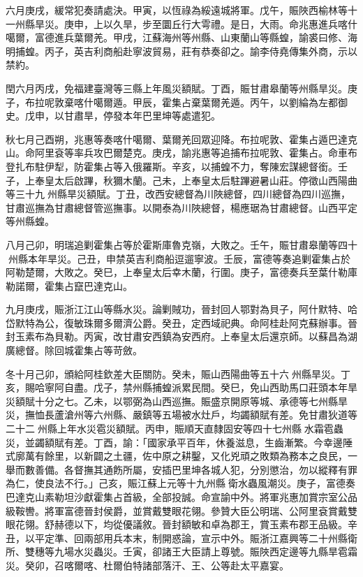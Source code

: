 \begin{pinyinscope}
六月庚戌，緩常犯奏請處決。甲寅，以恆祿為綏遠城將軍。戊午，賑陜西榆林等十一州縣旱災。庚申，上以久旱，步至圜丘行大雩禮。是日，大雨。命兆惠進兵喀什噶爾，富德進兵葉爾羌。甲戌，江蘇海州等州縣、山東蘭山等縣蝗，諭裘曰修、海明捕蝗。丙子，英吉利商船赴寧波貿易，莊有恭奏卻之。諭李侍堯傳集外商，示以禁約。

閏六月丙戌，免福建臺灣等三縣上年風災額賦。丁酉，賑甘肅皋蘭等州縣旱災。庚子，布拉呢敦棄喀什噶爾遁。甲辰，霍集占棄葉爾羌遁。丙午，以劉綸為左都御史。戊申，以甘肅旱，停發本年巴里坤等處遣犯。

秋七月己酉朔，兆惠等奏喀什噶爾、葉爾羌回眾迎降。布拉呢敦、霍集占遁巴達克山。命阿里袞等率兵攻巴爾楚克。庚戌，諭兆惠等追捕布拉呢敦、霍集占。命車布登扎布駐伊犁，防霍集占等入俄羅斯。辛亥，以捕蝗不力，奪陳宏謀總督銜。壬子，上奉皇太后啟蹕，秋獮木蘭。己未，上奉皇太后駐蹕避暑山莊。停徵山西陽曲等三十九州縣旱災額賦。丁丑，改西安總督為川陜總督，四川總督為四川巡撫，甘肅巡撫為甘肅總督管巡撫事。以開泰為川陜總督，楊應琚為甘肅總督。山西平定等州縣蝗。

八月己卯，明瑞追剿霍集占等於霍斯庫魯克嶺，大敗之。壬午，賑甘肅皋蘭等四十州縣本年旱災。己丑，申禁英吉利商船逗遛寧波。壬辰，富德等奏追剿霍集占於阿勒楚爾，大敗之。癸巳，上奉皇太后幸木蘭，行圍。庚子，富德奏兵至葉什勒庫勒諾爾，霍集占竄巴達克山。

九月庚戌，賑浙江江山等縣水災。論剿賊功，晉封回人鄂對為貝子，阿什默特、哈岱默特為公，復敏珠爾多爾濟公爵。癸丑，定西域祀典。命阿桂赴阿克蘇辦事。晉封玉素布為貝勒。丙寅，改甘肅安西鎮為安西府。上奉皇太后還京師。以蘇昌為湖廣總督。除回城霍集占等苛斂。

冬十月己卯，頒給阿桂欽差大臣關防。癸未，賑山西陽曲等五十六州縣旱災。丁亥，賜哈寧阿自盡。戊子，禁州縣捕蝗派累民間。癸巳，免山西助馬口莊頭本年旱災額賦十分之七。乙未，以鄂弼為山西巡撫。賑盛京開原等城、承德等七州縣旱災，撫恤長蘆滄州等六州縣、嚴鎮等五場被水灶戶，均蠲額賦有差。免甘肅狄道等二十二州縣上年水災雹災額賦。丙申，賑順天直隸固安等四十七州縣水霜雹蟲災，並蠲額賦有差。丁酉，諭：「國家承平百年，休養滋息，生齒漸繁。今幸邊陲式廓萬有餘里，以新闢之土疆，佐中原之耕鑿，又化兇頑之敗類為務本之良民，一舉而數善備。各督撫其通飭所屬，安插巴里坤各城人犯，分別懲治，勿以縱釋有罪為仁，使良法不行。」己亥，賑江蘇上元等十九州縣衛水蟲風潮災。庚子，富德奏巴達克山素勒坦沙獻霍集占首級，全部投誠。命宣諭中外。將軍兆惠加賞宗室公品級鞍轡。將軍富德晉封侯爵，並賞戴雙眼花翎。參贊大臣公明瑞、公阿里袞賞戴雙眼花翎。舒赫德以下，均從優議敘。晉封額敏和卓為郡王，賞玉素布郡王品級。辛丑，以平定準、回兩部用兵本末，制開惑論，宣示中外。賑浙江嘉興等二十州縣衛所、雙穗等九場水災蟲災。壬寅，卻諸王大臣請上尊號。賑陜西定邊等九縣旱雹霜災。癸卯，召喀爾喀、杜爾伯特諸部落汗、王、公等赴太平嘉宴。


\end{pinyinscope}
